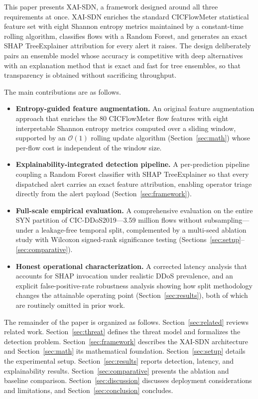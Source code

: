﻿\documentclass[review,12pt]{elsarticle}
\begin{document}
This paper presents XAI-SDN, a framework designed around all three requirements at once. XAI-SDN enriches the standard CICFlowMeter statistical feature set with eight Shannon entropy metrics maintained by a constant-time rolling algorithm, classifies flows with a Random Forest, and generates an exact SHAP TreeExplainer attribution for every alert it raises. The design deliberately pairs an ensemble model whose accuracy is competitive with deep alternatives with an explanation method that is exact and fast for tree ensembles, so that transparency is obtained without sacrificing throughput.

The main contributions are as follows.
\begin{itemize}
\item \textbf{Entropy-guided feature augmentation.} An original feature augmentation approach that enriches the 80 CICFlowMeter flow features with eight interpretable Shannon entropy metrics computed over a sliding window, supported by an $\mathcal{O}(1)$ rolling update algorithm (Section~\ref{sec:math}) whose per-flow cost is independent of the window size.
\item \textbf{Explainability-integrated detection pipeline.} A per-prediction pipeline coupling a Random Forest classifier with SHAP TreeExplainer so that every dispatched alert carries an exact feature attribution, enabling operator triage directly from the alert payload (Section~\ref{sec:framework}).
\item \textbf{Full-scale empirical evaluation.} A comprehensive evaluation on the entire SYN partition of CIC-DDoS2019---3.59 million flows without subsampling---under a leakage-free temporal split, complemented by a multi-seed ablation study with Wilcoxon signed-rank significance testing (Sections~\ref{sec:setup}--\ref{sec:comparative}).
\item \textbf{Honest operational characterization.} A corrected latency analysis that accounts for SHAP invocation under realistic DDoS prevalence, and an explicit false-positive-rate robustness analysis showing how split methodology changes the attainable operating point (Section~\ref{sec:results}), both of which are routinely omitted in prior work.
\end{itemize}

The remainder of the paper is organized as follows. Section~\ref{sec:related} reviews related work. Section~\ref{sec:threat} defines the threat model and formalizes the detection problem. Section~\ref{sec:framework} describes the XAI-SDN architecture and Section~\ref{sec:math} its mathematical foundation. Section~\ref{sec:setup} details the experimental setup. Section~\ref{sec:results} reports detection, latency, and explainability results. Section~\ref{sec:comparative} presents the ablation and baseline comparison. Section~\ref{sec:discussion} discusses deployment considerations and limitations, and Section~\ref{sec:conclusion} concludes.
\end{document}
